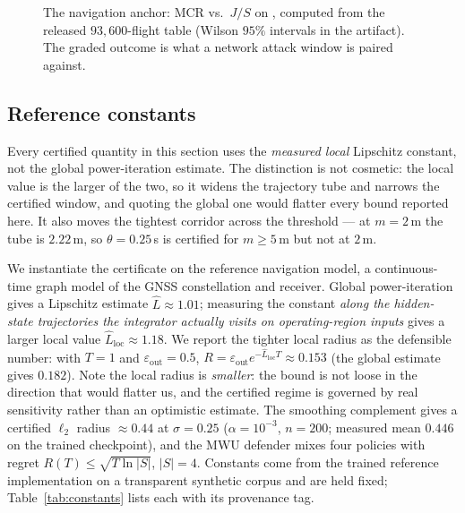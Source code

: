 \begin{figure}[t]
\centering
{}
\caption{The navigation anchor: MCR vs.\ $J/S$ on ,
computed from the released $93{,}600$-flight table (Wilson $95\%$ intervals in
the artifact). The graded outcome is what a network attack window is paired
against.}
\label{fig:mcr}
\end{figure}

\subsection{Reference constants}
Every certified quantity in this section uses the \emph{measured local}
Lipschitz constant, not the global power-iteration estimate. The distinction
is not cosmetic: the local value is the larger of the two, so it widens the
trajectory tube and narrows the certified window, and quoting the global one
would flatter every bound reported here. It also moves the tightest corridor
across the threshold --- at $m{=}2$\,m the tube is $2.22$\,m, so
$\theta{=}0.25$\,s is certified for $m\ge5$\,m but not at $2$\,m.

We instantiate the certificate on the reference navigation model, a
continuous-time graph model of the GNSS constellation and receiver. Global
power-iteration gives a Lipschitz estimate $\hat L\approx1.01$; measuring the
constant \emph{along the hidden-state trajectories the integrator actually
visits on operating-region inputs} gives a larger local value
$\hat L_{\mathrm{loc}}\approx1.18$. We report the tighter local radius as the
defensible number: with $T=1$ and $\varepsilon_{\mathrm{out}}=0.5$,
$R=\varepsilon_{\mathrm{out}}e^{-\hat L_{\mathrm{loc}}T}\approx0.153$ (the
global estimate gives $0.182$). Note the local radius is \emph{smaller}: the
bound is not loose in the direction that would flatter us, and the certified
regime is governed by real sensitivity rather than an optimistic estimate. The
smoothing complement gives a certified $\ell_2$ radius $\approx0.44$ at
$\sigma=0.25$ ($\alpha=10^{-3}$, $n=200$; measured mean $0.446$ on the trained
checkpoint), and the MWU defender mixes four policies with regret
$R(T)\le\sqrt{T\ln|S|}$, $|S|=4$. Constants come from the trained reference
implementation on a transparent synthetic corpus and are held fixed;
Table~\ref{tab:constants} lists each with its provenance tag.

